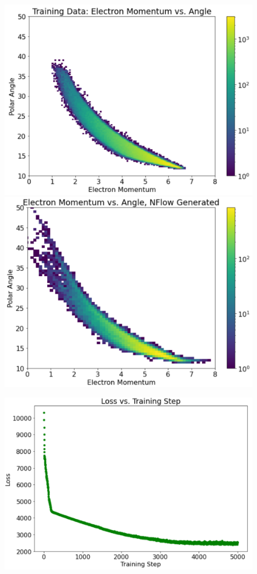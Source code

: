 \begin{figure}[!ht]
    \centering
    \begin{minipage}{.5\textwidth}
        \centering
        \includegraphics[width=.8\textwidth,trim={0 0 5cm 0},clip]{pictures/training_data_distribution_hires.png}
        \includegraphics[width=.8\textwidth,trim={0 0 5cm 0},clip]{pictures/nflow_data_distribution_hires_0.png}
    \end{minipage}%
    \begin{minipage}{0.5\textwidth}
        \centering
        \includegraphics[width=1\textwidth,trim={0 0 0 0},clip]{pictures/loss_vs_time_2.png}

\end{minipage}
\end{figure}
